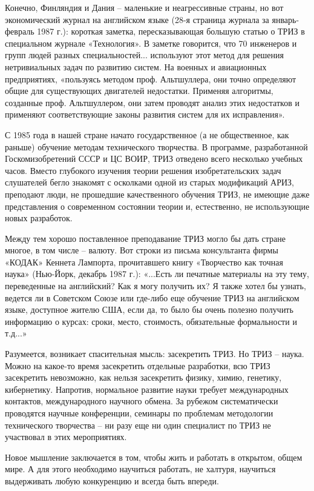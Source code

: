 \documentclass[11pt,a4paper]{article}
\begin{document}
Конечно, Финляндия и Дания -- маленькие и неагрессивные страны, но вот
экономический журнал на английском языке (28-я страница журнала за
январь-февраль 1987 г.): короткая заметка, пересказывающая большую статью о
ТРИЗ в специальном журнале «Технология». В заметке говорится, что 70 инженеров
и групп людей разных специальностей... используют этот метод для решения
нетривиальных задач по развитию систем. На военных и авиационных предприятиях,
«пользуясь методом проф. Альтшуллера, они точно определяют общие для
существующих двигателей недостатки. Применяя алгоритмы, созданные
проф. Альтшуллером, они затем проводят анализ этих недостатков и применяют
соответствующие законы развития систем для их исправления».

С 1985 года в нашей стране начато государственное (а не общественное, как
раньше) обучение методам технического творчества. В программе, разработанной
Госкомизобретений СССР и ЦС ВОИР, ТРИЗ отведено всего несколько учебных часов.
Вместо глубокого изучения теории решения изобретательских задач слушателей
бегло знакомят с осколками одной из старых модификаций АРИЗ, преподают люди,
не прошедшие качественного обучения ТРИЗ, не имеющие даже представления о
современном состоянии теории и, естественно, не использующие новых разработок.

Между тем хорошо поставленное преподавание ТРИЗ могло бы дать стране многое, в
том числе -- валюту. Вот строки из письма консультанта фирмы «КОДАК» Кеннета
Лампорта, прочитавшего книгу «Творчество как точная наука» (Нью-Йорк, декабрь
1987 г.): «...Есть ли печатные материалы на эту тему, переведенные на
английский? Как я могу получить их? Я также хотел бы узнать, ведется ли в
Советском Союзе или где-либо еще обучение ТРИЗ на английском языке, доступное
жителю США, если да, то было бы очень полезно получить информацию о курсах:
сроки, место, стоимость, обязательные формальности и т.д...»

Разумеется, возникает спасительная мысль: засекретить ТРИЗ. Но ТРИЗ -- наука.
Можно на какое-то время засекретить отдельные разработки, всю ТРИЗ засекретить
невозможно, как нельзя засекретить физику, химию, генетику, кибернетику.
Напротив, нормальное развитие науки требует международных контактов,
международного научного обмена. За рубежом систематически проводятся научные
конференции, семинары по проблемам методологии технического творчества -- ни
разу еще ни один специалист по ТРИЗ не участвовал в этих мероприятиях.

Новое мышление заключается в том, чтобы жить и работать в открытом, общем
мире. А для этого необходимо научиться работать, не халтуря, научиться
выдерживать любую конкуренцию и всегда быть впереди.
\end{document}
